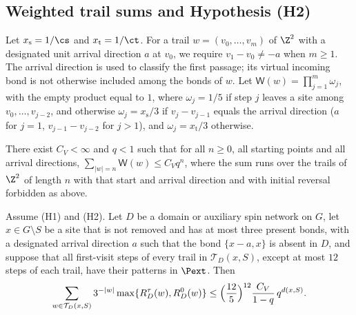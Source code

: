 \subsection{Weighted trail sums and Hypothesis (H2)}\label{s:H2def}

Let $x_{\mathrm s}=1/\cs$ and $x_{\mathrm t}=1/\ct$.
For a trail $w=(v_0,\dots,v_m)$ of $\Z^2$ with a designated unit arrival direction $a$ at $v_0$, we require $v_1-v_0\ne-a$ when $m\ge1$.
The arrival direction is used to classify the first passage; its virtual incoming bond is not otherwise included among the bonds of $w$.
Let $\mathsf W(w)=\prod_{j=1}^m\omega_j$, with the empty product equal to $1$,
where $\omega_j=1/5$ if step $j$ leaves a site among $v_0,\dots,v_{j-2}$,
and otherwise $\omega_j=x_{\mathrm s}/3$ if $v_j-v_{j-1}$ equals the arrival direction ($a$ for $j=1$, $v_{j-1}-v_{j-2}$ for $j>1$), and $\omega_j=x_{\mathrm t}/3$ otherwise.

\begin{hypothesis}[H2]\label{h:H2}
There exist $C_V < \infty$ and $q < 1$ such that for all $n \ge 0$, all starting points and all arrival directions, $\sum_{|w| = n} \mathsf W(w) \le C_V q^n$, where the sum runs over the trails of $\Z^2$ of length $n$ with that start and arrival direction and with initial reversal forbidden as above.
\end{hypothesis}

\begin{lemma}\label{l:onepoint}
Assume (H1) and (H2). Let $D$ be a domain or auxiliary spin network
on $G$, let $x\in G\setminus S$ be a site that is not removed and
has at most three present bonds, with a designated arrival direction $a$ such that the bond $\{x-a,x\}$ is absent in $D$,
and suppose that all first-visit steps of every trail in
$\mathcal T_D(x,S)$, except at most $12$ steps of each trail, have
their patterns in $\Pext$. Then
\begin{equation*}
\sum_{w\in\mathcal T_D(x,S)}3^{-|w|}
\max\{R^\tau_D(w),R^0_D(w)\}
\le \Bigl(\frac{12}{5}\Bigr)^{12}
\frac{C_V}{1-q}\,q^{d(x,S)}.
\end{equation*}
\end{lemma}

